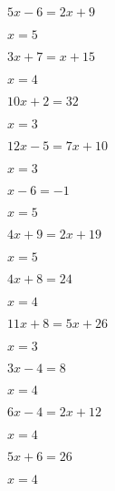 \documentclass{ximera}
\begin{document}
\begin{exercise}
\begin{xmmulticols}
    \begin{question} \( 5x - 6  = 2x + 9   \) \begin{uitkomst} \( x  = 5  \) \end{uitkomst} \end{question} 
    \begin{question} \( 3x + 7  = x + 15   \) \begin{uitkomst} \( x  = 4  \) \end{uitkomst} \end{question} 
    \begin{question} \( 10x + 2 = 32       \) \begin{uitkomst} \( x  = 3  \) \end{uitkomst} \end{question}
    \begin{question} \( 12x - 5 = 7x + 10  \) \begin{uitkomst} \( x  = 3  \) \end{uitkomst} \end{question} 
    \begin{question} \( x - 6   = -1       \) \begin{uitkomst} \( x  = 5  \) \end{uitkomst} \end{question}
    \begin{question} \( 4x + 9  = 2x + 19  \) \begin{uitkomst} \( x  = 5  \) \end{uitkomst} \end{question} 
    \begin{question} \( 4x + 8  = 24       \) \begin{uitkomst} \( x  = 4  \) \end{uitkomst} \end{question}
    \begin{question} \( 11x + 8 = 5x + 26  \) \begin{uitkomst} \( x  = 3  \) \end{uitkomst} \end{question} 
    \begin{question} \( 3x - 4  = 8        \) \begin{uitkomst} \( x  = 4  \) \end{uitkomst} \end{question}
    \begin{question} \( 6x - 4  = 2x + 12  \) \begin{uitkomst} \( x  = 4  \) \end{uitkomst} \end{question} 
    \begin{question} \( 5x + 6  = 26       \) \begin{uitkomst} \( x  = 4  \) \end{uitkomst} \end{question}
    
  \end{xmmulticols}
\end{exercise}
\end{document}
